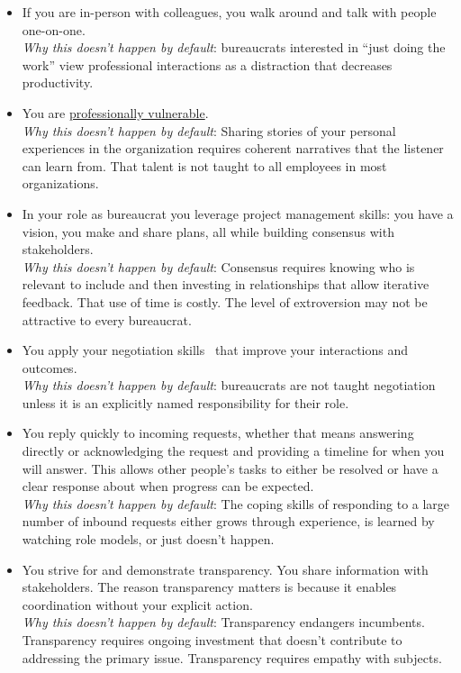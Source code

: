 \begin{itemize}
    \item If you are in-person with colleagues, you walk around and talk with people one-on-one.  \\
    \textit{Why this doesn't happen by default}: bureaucrats interested in ``just doing the work'' view professional interactions as a distraction that decreases productivity. 
    \item You are 
    \hyperref[sec:professional-vulnerability]{professionally vulnerable}. \\
    \textit{Why this doesn't happen by default}: Sharing stories of your personal experiences in the organization requires coherent narratives that the listener can learn from. That talent is not taught to all employees in most organizations. 
    \item In your role as bureaucrat you leverage project management skills: you have a vision, you make and share plans, all while building consensus with stakeholders. \\
    \textit{Why this doesn't happen by default}: Consensus requires knowing who is relevant to include and then investing in relationships that allow iterative feedback. That use of time is costly. The level of extroversion may not be attractive to every bureaucrat.
    \item You apply your negotiation skills~\cite{1982_Cohen} that improve your interactions and outcomes.\\
    \textit{Why this doesn't happen by default}: bureaucrats are not taught negotiation unless it is an explicitly named responsibility for their role. 
    \item You reply quickly to incoming requests, whether that means answering directly or acknowledging the request and providing a timeline for when you will answer. This allows other people's tasks to either be resolved or have a clear response about when progress can be expected. \\
    \textit{Why this doesn't happen by default}: The coping skills of responding to a large number of inbound requests either grows through experience, is learned by watching role models, or just doesn't happen.
    \item You strive for and demonstrate transparency. You share information with stakeholders. The reason transparency matters is because it enables coordination without your explicit action.\\
    \textit{Why this doesn't happen by default}: Transparency endangers incumbents. Transparency requires ongoing investment that doesn't contribute to addressing the primary issue. Transparency requires empathy with subjects.
\end{itemize}

